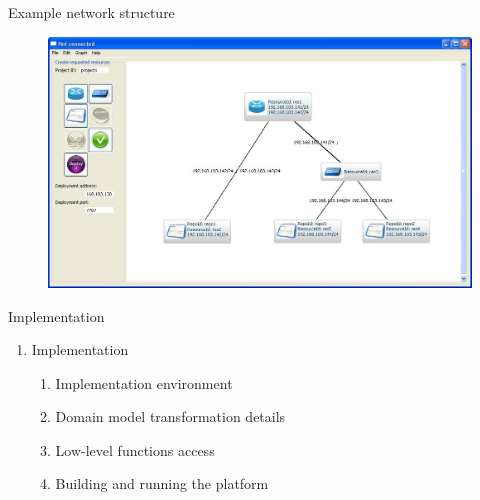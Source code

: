 \documentclass{beamer}
\begin{document}
\setcounter{enumi_chapter}{\value{enumi}}

\begin{frame}{Example network structure}
		
	\begin{figure}[H]
		\includegraphics[width=\textwidth]{img/network.jpg}
	\end{figure}

\end{frame}

\setcounter{enumi_chapter}{\value{enumi}}


\begin{frame}{Implementation}

	\begin{enumerate}
		\setcounter{enumi}{\value{enumi_chapter}}

	\item Implementation

		\begin{enumerate}
			\item Implementation environment
			\item Domain model transformation details
			\item Low-level functions access
			\item Building and running the platform
		\end{enumerate}

	\end{enumerate}

\end{frame}

\setcounter{enumi_chapter}{\value{enumi}}
\end{document}
